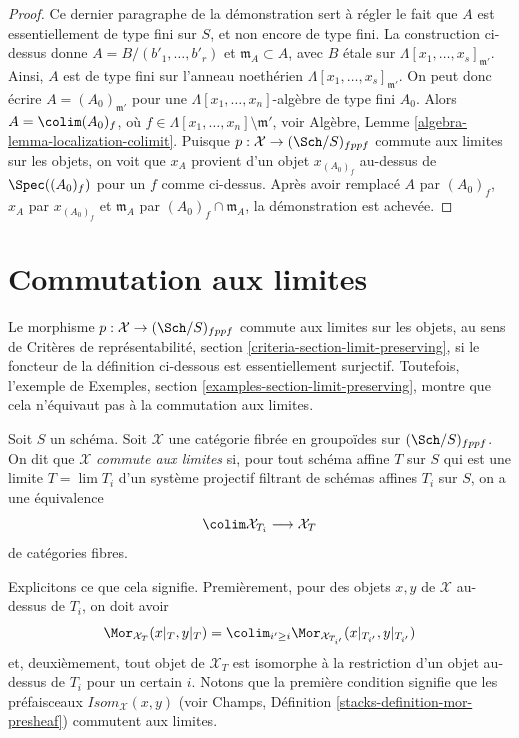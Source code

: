 \begin{proof}
\medskip\noindent
Ce dernier paragraphe de la démonstration sert à régler le fait que $A$ est
essentiellement de type fini sur $S$, et non encore de type fini.
La construction ci-dessus donne $A = B/(b'_1, \ldots, b'_r)$ et
$\mathfrak m_A \subset A$, avec $B$ \'etale sur
$\Lambda[x_1, \ldots, x_s]_{\mathfrak m'}$. Ainsi, $A$ est de type
fini sur l'anneau noethérien $\Lambda[x_1, \ldots, x_s]_{\mathfrak m'}$.
On peut donc écrire $A = (A_0)_{\mathfrak m'}$ pour une
$\Lambda[x_1, \ldots, x_n]$-algèbre de type fini $A_0$. Alors
$A = \colim (A_0)_f$, où
$f \in \Lambda[x_1, \ldots, x_n] \setminus \mathfrak m'$, voir
Algèbre, Lemme \ref{algebra-lemma-localization-colimit}.
Puisque $p : \mathcal{X} \to (\Sch/S)_{fppf}$ commute aux limites sur les
objets, on voit que
$x_A$ provient d'un objet $x_{(A_0)_f}$ au-dessus de $\Spec((A_0)_f)$ pour
un $f$ comme ci-dessus. Après avoir remplacé $A$ par $(A_0)_f$, $x_A$ par
$x_{(A_0)_f}$ et $\mathfrak m_A$ par $(A_0)_f \cap \mathfrak m_A$,
la démonstration est achevée.
\end{proof}





\section{Commutation aux limites}
\label{section-limits}

\noindent
Le morphisme $p : \mathcal{X} \to (\Sch/S)_{fppf}$ commute aux limites
sur les objets, au sens de Critères de représentabilité, section
\ref{criteria-section-limit-preserving}, si le foncteur de la définition
ci-dessous est essentiellement surjectif. Toutefois, l'exemple
de Exemples, section \ref{examples-section-limit-preserving},
montre que cela n'équivaut pas à la commutation aux limites.

\begin{definition}
\label{definition-limit-preserving}
Soit $S$ un schéma. Soit $\mathcal{X}$ une catégorie fibrée en groupoïdes
sur $(\Sch/S)_{fppf}$. On dit que $\mathcal{X}$ {\it commute aux limites}
si, pour tout schéma affine $T$ sur $S$ qui est une limite $T = \lim T_i$
d'un système projectif filtrant de schémas affines $T_i$ sur $S$, on a
une équivalence
$$
\colim \mathcal{X}_{T_i} \longrightarrow \mathcal{X}_T
$$
de catégories fibres.
\end{definition}

\noindent
Explicitons ce que cela signifie. Premièrement, pour des objets $x, y$ de $\mathcal{X}$
au-dessus de $T_i$, on doit avoir
$$
\Mor_{\mathcal{X}_T}(x|_T, y|_T) =
\colim_{i' \geq i} \Mor_{\mathcal{X}_{T_{i'}}}(x|_{T_{i'}}, y|_{T_{i'}})
$$
et, deuxièmement, tout objet de $\mathcal{X}_T$ est isomorphe à la restriction
d'un objet au-dessus de $T_i$ pour un certain $i$. Notons que la première condition signifie
que les préfaisceaux $\mathit{Isom}_\mathcal{X}(x, y)$ (voir
Champs, Définition \ref{stacks-definition-mor-presheaf})
commutent aux limites.

